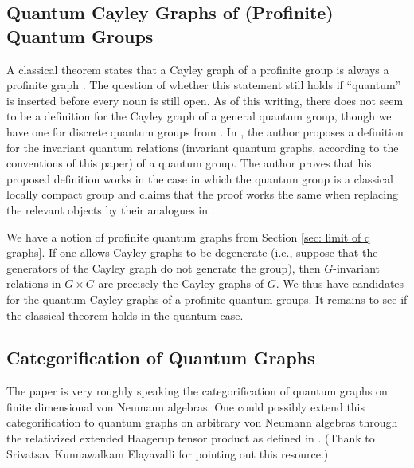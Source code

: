 \documentclass[12pt]{article}
\theoremstyle{definition}
\newcommand{\<}{\langle}
\renewcommand{\>}{\rangle}
\begin{document}
\subsection{Quantum Cayley Graphs of (Profinite) Quantum Groups} \label{question: qcayleygraph}

A classical theorem states that a Cayley graph of a profinite group is always a profinite graph \cite[Example 2.1.12]{profinitebook}. The question of whether this statement still holds if ``quantum'' is inserted before every noun is still open. As of this writing, there does not seem to be a definition for the Cayley graph of a general quantum group, though we have one for discrete quantum groups from \cite{quantum-cayley}. In \cite{gp-obs}, the author proposes a definition for the invariant quantum relations (invariant quantum graphs, according to the conventions of this paper) of a quantum group. The author proves that his proposed definition works in the case in which the quantum group is a classical locally compact group and claims that the proof works the same when replacing the relevant objects by their analogues in \cite{lcqg}. 

We have a notion of profinite quantum graphs from Section \ref{sec: limit of q graphs}. If one allows Cayley graphs to be degenerate (i.e., suppose that the generators of the Cayley graph do not generate the group), then $G$-invariant relations in $G \times G$ are precisely the Cayley graphs of $G$. We thus have candidates for the quantum Cayley graphs of a profinite quantum groups. It remains to see if the classical theorem holds in the quantum case.

\subsection{Categorification of Quantum Graphs} \label{question: categorification}

The paper \cite{categorified-graphs} is very roughly speaking the categorification of quantum graphs on finite dimensional von Neumann algebras. One could possibly extend this categorification to quantum graphs on arbitrary von Neumann algebras through the relativized extended Haagerup tensor product as defined in \cite[Definition 1.3]{magajna-strong}. (Thank to Srivatsav Kunnawalkam Elayavalli for pointing out this resource.)

\begin{center}
    
\end{center}
\end{document}
